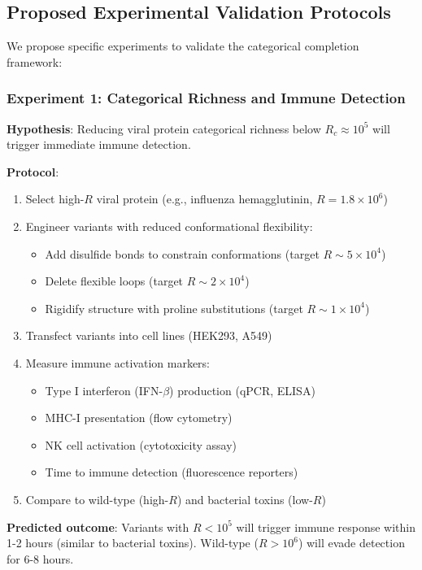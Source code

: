 \documentclass[11pt]{article}
\begin{document}
\subsection{Proposed Experimental Validation Protocols}

We propose specific experiments to validate the categorical completion framework:

\subsubsection{Experiment 1: Categorical Richness and Immune Detection}

\textbf{Hypothesis}: Reducing viral protein categorical richness below $R_c \approx 10^5$ will trigger immediate immune detection.

\textbf{Protocol}:
\begin{enumerate}
\item Select high-$R$ viral protein (e.g., influenza hemagglutinin, $R = 1.8 \times 10^6$)
\item Engineer variants with reduced conformational flexibility:
\begin{itemize}
\item Add disulfide bonds to constrain conformations (target $R \sim 5 \times 10^4$)
\item Delete flexible loops (target $R \sim 2 \times 10^4$)
\item Rigidify structure with proline substitutions (target $R \sim 1 \times 10^4$)
\end{itemize}
\item Transfect variants into cell lines (HEK293, A549)
\item Measure immune activation markers:
\begin{itemize}
\item Type I interferon (IFN-$\beta$) production (qPCR, ELISA)
\item MHC-I presentation (flow cytometry)
\item NK cell activation (cytotoxicity assay)
\item Time to immune detection (fluorescence reporters)
\end{itemize}
\item Compare to wild-type (high-$R$) and bacterial toxins (low-$R$)
\end{enumerate}

\textbf{Predicted outcome}: Variants with $R < 10^5$ will trigger immune response within 1-2 hours (similar to bacterial toxins). Wild-type ($R > 10^6$) will evade detection for 6-8 hours.
\end{document}
